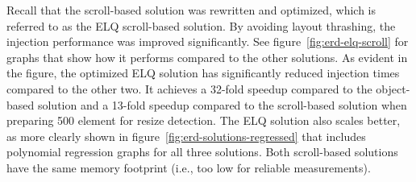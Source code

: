 \documentclass{acm_proc_article-sp}
\newcommand{\glspl}[1]{#1}
\newcommand{\gls}[1]{#1}
\begin{document}
      Recall that the scroll-based solution was rewritten and optimized, which is referred to as the \gls{ELQ} scroll-based solution.
      By avoiding \gls{layout thrashing}, the injection performance was improved significantly.
      See figure~\ref{fig:erd-elq-scroll} for graphs that show how it performs compared to the other solutions.
      As evident in the figure, the optimized \gls{ELQ} solution has significantly reduced injection times compared to the other two.
      It achieves a 32-fold speedup compared to the object-based solution and a 13-fold speedup compared to the scroll-based solution when preparing 500 \glspl{element} for resize detection.
      The \gls{ELQ} solution also scales better, as more clearly shown in figure~\ref{fig:erd-solutions-regressed} that includes polynomial regression graphs for all three solutions.
      Both scroll-based solutions have the same memory footprint (i.e., too low for reliable measurements).
\end{document}
